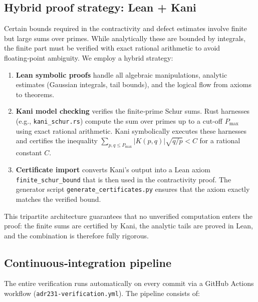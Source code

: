 \documentclass[11pt,reqno]{amsart}
\theoremstyle{definition}
\theoremstyle{remark}
\begin{document}
\subsection{Hybrid proof strategy: Lean + Kani}

Certain bounds required in the contractivity and defect estimates involve finite but large sums over primes.  While analytically these are bounded by integrals, the finite part must be verified with exact rational arithmetic to avoid floating‑point ambiguity.  We employ a hybrid strategy:

\begin{enumerate}
\item \textbf{Lean symbolic proofs} handle all algebraic manipulations, analytic estimates (Gaussian integrals, tail bounds), and the logical flow from axioms to theorems.
\item \textbf{Kani model checking} verifies the finite‑prime Schur sums.  Rust harnesses (e.g., \texttt{kani\_schur.rs}) compute the sum over primes up to a cut‑off \(P_{\max}\) using exact rational arithmetic.  Kani symbolically executes these harnesses and certifies the inequality \(\sum_{p,q\le P_{\max}} |K(p,q)|\sqrt{q/p} < C\) for a rational constant \(C\).
\item \textbf{Certificate import} converts Kani's output into a Lean axiom \texttt{finite\_schur\_bound} that is then used in the contractivity proof.  The generator script \texttt{generate\_certificates.py} ensures that the axiom exactly matches the verified bound.
\end{enumerate}

This tripartite architecture guarantees that no unverified computation enters the proof: the finite sums are certified by Kani, the analytic tails are proved in Lean, and the combination is therefore fully rigorous.

\subsection{Continuous‑integration pipeline}

The entire verification runs automatically on every commit via a GitHub Actions workflow (\texttt{adr231-verification.yml}).  The pipeline consists of:
\end{document}
